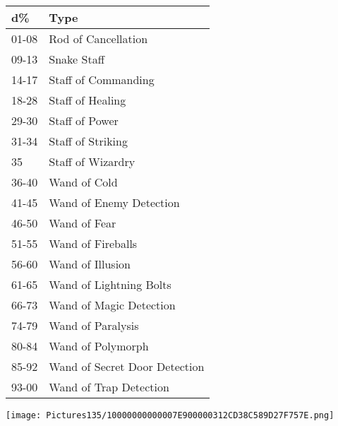 \documentclass[a4paper,twoside,openany,10pt]{book}
\begin{document}
\begin{multicols}{2}
\begin{tabular*}{0.93\linewidth}{@{\extracolsep{\fill}}ll}
\textbf{d\%} & \textbf{Type} \\\toprule
01-08 & Rod of Cancellation \\\hline
09-13 & Snake Staff \\\hline
14-17 & Staff of Commanding \\\hline
18-28 & Staff of Healing \\\hline
29-30 & Staff of Power \\\hline
31-34 & Staff of Striking \\\hline
35 & Staff of Wizardry \\\hline
36-40 & Wand of Cold \\\hline
41-45 & Wand of Enemy Detection \\\hline
46-50 & Wand of Fear \\\hline
51-55 & Wand of Fireballs \\\hline
56-60 & Wand of Illusion \\\hline
61-65 & Wand of Lightning Bolts \\\hline
66-73 & Wand of Magic Detection \\\hline
74-79 & Wand of Paralysis \\\hline
80-84 & Wand of Polymorph \\\hline
85-92 & Wand of Secret Door Detection \\\hline
93-00 & Wand of Trap Detection \\\bottomrule
\end{tabular*}

\end{multicols}

\vfill

 \texttt{[image: Pictures135/10000000000007E900000312CD38C589D27F757E.png]} 
 
 \pagebreak
 
\end{document}
